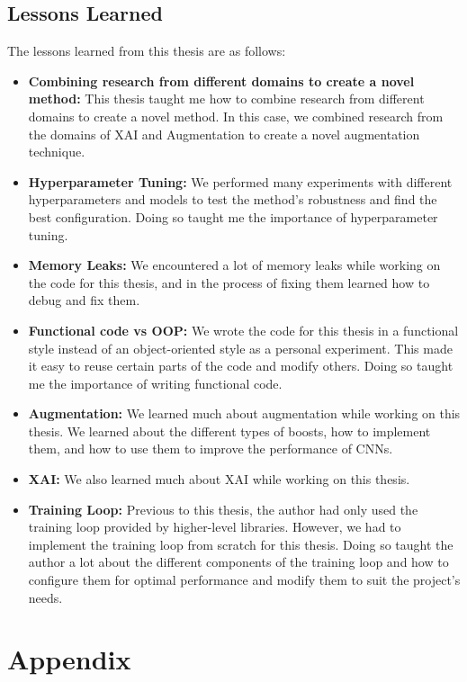 \documentclass[a4paper,11pt,openright]{book}
\begin{document}
\section{Lessons Learned}
The lessons learned from this thesis are as follows:
\begin{itemize}
    \item \textbf{Combining research from different domains to create a novel method: } This thesis taught me how to combine research from different domains to create a novel method. In this case, we combined research from the domains of XAI and Augmentation to create a novel augmentation technique.
    \item \textbf{Hyperparameter Tuning: } We performed many experiments with different hyperparameters and models to test the method's robustness and find the best configuration. Doing so taught me the importance of hyperparameter tuning.
    \item \textbf{Memory Leaks: }We encountered a lot of memory leaks while working on the code for this thesis, and in the process of fixing them learned how to debug and fix them. 
    \item \textbf{Functional code vs OOP: }We wrote the code for this thesis in a functional style instead of an object-oriented style as a personal experiment. This made it easy to reuse certain parts of the code and modify others. Doing so taught me the importance of writing functional code.
    \item \textbf{Augmentation: }We learned much about augmentation while working on this thesis. We learned about the different types of boosts, how to implement them, and how to use them to improve the performance of CNNs.
    \item \textbf{XAI: }We also learned much about XAI while working on this thesis. 
    \item \textbf{Training Loop: } Previous to this thesis, the author had only used the training loop provided by higher-level libraries. However, we had to implement the training loop from scratch for this thesis. Doing so taught the author a lot about the different components of the training loop and how to configure them for optimal performance and modify them to suit the project's needs.
\end{itemize}


\chapter{Appendix} \label{ch:appendix}
\end{document}
